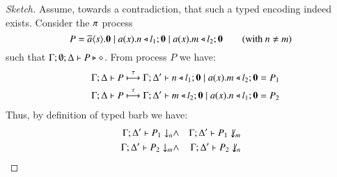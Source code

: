 \begin{proof}[Sketch]
Assume, towards a contradiction, that such a typed encoding indeed exists. 
Consider the $\pi$ process
$$
P = \overline{a} \langle s \rangle . \mathbf{0} \;|\; a (x) . n \triangleleft l_1 ; \mathbf{0} \;|\; a (x) . m \triangleleft l_2 ; \mathbf{0} \qquad \text{(with $n \neq m$)}
$$
such that 
$\Gamma; \emptyset; \Delta \vdash P \triangleright \diamond$.
From process $P$ we have: %
\begin{eqnarray}
& & \Gamma; \Delta \vdash P \stackrel{\tau}{\longmapsto} \Gamma; \Delta' \vdash n \triangleleft l_1 ; \mathbf{0} \;|\; a (x) . m \triangleleft l_2 ; \mathbf{0} = P_1  \label{eq:nn3} \\
& & \Gamma; \Delta \vdash P \stackrel{\tau}{\longmapsto} \Gamma; \Delta' \vdash m \triangleleft l_2 ; \mathbf{0} \;|\; a (x) . n \triangleleft l_1 ; \mathbf{0} = P_2  \label{eq:nn4}
\end{eqnarray}
Thus, by definition of typed barb we  have:
\begin{eqnarray}
\Gamma; \Delta' \vdash P_1 \downarrow_{n} & \land & 
\Gamma; \Delta' \vdash P_1 \not\downarrow_{m} \label{eq:nn1} \\
\Gamma; \Delta' \vdash P_2 \downarrow_{m} & \land & 
\Gamma; \Delta' \vdash P_2 \not\downarrow_{n} \label{eq:nn2}
\end{eqnarray}


\end{proof}
